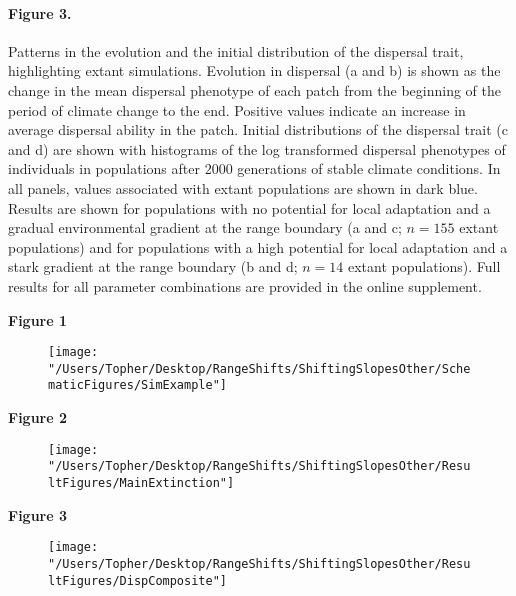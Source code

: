 \documentclass[12pt, oneside]{article}
\begin{document}
\paragraph{Figure 3.} Patterns in the evolution and the initial distribution of the dispersal trait, highlighting extant simulations. Evolution in dispersal (a and b) is shown as the change in the mean dispersal phenotype of each patch from the beginning of the period of climate change to the end. Positive values indicate an increase in average dispersal ability in the patch. Initial distributions of the dispersal trait (c and d) are shown with histograms of the log transformed dispersal phenotypes of individuals in populations after $2000$ generations of stable climate conditions. In all panels, values associated with extant populations are shown in dark blue. Results are shown for populations with no potential for local adaptation and a gradual environmental gradient at the range boundary (a and c; $n = 155$ extant populations) and for populations with a high potential for local adaptation and a stark gradient at the range boundary (b and d; $n = 14$ extant populations). Full results for all parameter combinations are provided in the online supplement.

\newpage

\large{\textbf{Figure 1}}
\begin{figure}
\centering
\texttt{[image: "/Users/Topher/Desktop/RangeShifts/ShiftingSlopesOther/SchematicFigures/SimExample"]}
\vspace{-5mm}
\label{fig:SimExample}
\end{figure}

\clearpage

\large{\textbf{Figure 2}}
\begin{figure}
\centering
\texttt{[image: "/Users/Topher/Desktop/RangeShifts/ShiftingSlopesOther/ResultFigures/MainExtinction"]}
\vspace{-5mm}
\label{fig:ExtProb}
\end{figure}

\clearpage

\large{\textbf{Figure 3}}
\begin{figure}
\centering
\texttt{[image: "/Users/Topher/Desktop/RangeShifts/ShiftingSlopesOther/ResultFigures/DispComposite"]}
\vspace{-5mm}
\label{fig:Disp}
\end{figure}
\end{document}
